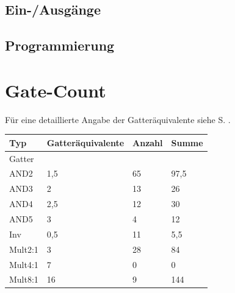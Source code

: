 \documentclass[11pt]{report}
\begin{document}
	\subsection{Ein-/Ausgänge}
	
	\subsection{Programmierung}
	
	\section{Gate-Count}
	Für eine detaillierte Angabe der Gatteräquivalente siehe S. \pageref{gatecounttable}.
	\begin{table}[]
		\centering
		\label{gatecounttable}
		\begin{tabular}{llll}
			\hline
			Typ                                          & Gatteräquivalente          & Anzahl                  & Summe                      \\ \hline\hline
			\multicolumn{1}{|l}{Gatter}                  &                            &                         & \multicolumn{1}{l|}{}      \\ \hline
			\multicolumn{1}{|l|}{AND2}                   & \multicolumn{1}{l|}{1,5}   & \multicolumn{1}{l|}{65} & \multicolumn{1}{l|}{97,5}  \\ \hline
			\multicolumn{1}{|l|}{AND3}                   & \multicolumn{1}{l|}{2}     & \multicolumn{1}{l|}{13} & \multicolumn{1}{l|}{26}    \\ \hline
			\multicolumn{1}{|l|}{AND4}                   & \multicolumn{1}{l|}{2,5}   & \multicolumn{1}{l|}{12} & \multicolumn{1}{l|}{30}    \\ \hline
			\multicolumn{1}{|l|}{AND5}                   & \multicolumn{1}{l|}{3}     & \multicolumn{1}{l|}{4}  & \multicolumn{1}{l|}{12}    \\ \hline
			\multicolumn{1}{|l|}{Inv}                    & \multicolumn{1}{l|}{0,5}   & \multicolumn{1}{l|}{11} & \multicolumn{1}{l|}{5,5}   \\ \hline
			\multicolumn{1}{|l|}{Mult2:1}                & \multicolumn{1}{l|}{3}     & \multicolumn{1}{l|}{28} & \multicolumn{1}{l|}{84}    \\ \hline
			\multicolumn{1}{|l|}{Mult4:1}                & \multicolumn{1}{l|}{7}     & \multicolumn{1}{l|}{0}  & \multicolumn{1}{l|}{0}     \\ \hline
			\multicolumn{1}{|l|}{Mult8:1}                & \multicolumn{1}{l|}{16}    & \multicolumn{1}{l|}{9}  & \multicolumn{1}{l|}{144}   \\ \hline

\end{tabular}
\end{table}
\end{document}
